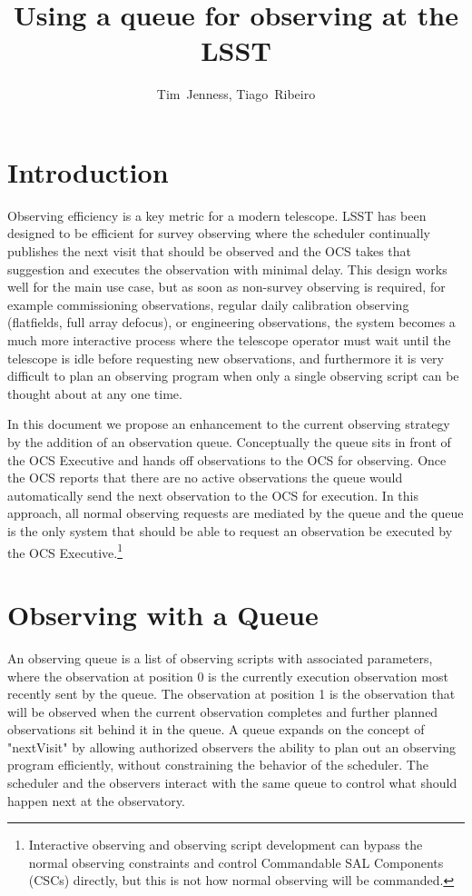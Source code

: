 \documentclass[TS,toc,lsstdraft]{lsstdoc}
\title{Using a queue for observing at the LSST}
\author         {Tim~Jenness, Tiago~Ribeiro}                %
\begin{document}
%
%
\maketitle


\section{Introduction}

Observing efficiency is a key metric for a modern telescope.
LSST has been designed to be efficient for survey observing where the scheduler continually publishes the next visit that should be observed and the OCS takes that suggestion and executes the observation with minimal delay.
This design works well for the main use case, but as soon as non-survey observing is required, for example commissioning observations, regular daily calibration observing (flatfields, full array defocus), or engineering observations, the system becomes a much more interactive process where the telescope operator must wait until the telescope is idle before requesting new observations, and furthermore it is very difficult to plan an observing program when only a single observing script can be thought about at any one time.

In this document we propose an enhancement to the current observing strategy by the addition of an observation queue.
Conceptually the queue sits in front of the OCS Executive and hands off observations to the OCS for observing.
Once the OCS reports that there are no active observations the queue would automatically send the next observation to the OCS for execution.
In this approach, all normal observing requests are mediated by the queue and the queue is the only system that should be able to request an observation be executed by the OCS Executive.\footnote{Interactive observing and observing script development can bypass the normal observing constraints and control Commandable SAL Components (CSCs) directly, but this is not how normal observing will be commanded.}


\section{Observing with a Queue}

An observing queue is a list of observing scripts with associated parameters, where the observation at position 0 is the currently execution observation most recently sent by the queue.
The observation at position 1 is the observation that will be observed when the current observation completes and further planned observations sit behind it in the queue.
A queue expands on the concept of "nextVisit" by allowing authorized observers the ability to plan out an observing program efficiently, without constraining the behavior of the scheduler.
The scheduler and the observers interact with the same queue to control what should happen next at the observatory.
\end{document}
